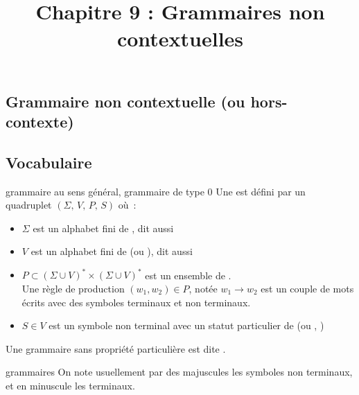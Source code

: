 

\begin{adjustwidth}{-3cm}{-3cm}

\setcounter{chapitre}{9}

\title{Chapitre 9 : Grammaires non contextuelles}
\maketitle

\section{Grammaire non contextuelle (ou hors-contexte)}

\subsection{Vocabulaire}

\begin{definition}{}{grammaire au sens général, grammaire de type 0}
    Une  est défini par un quadruplet $(\Sigma,\,V,\,P,\,S)$ où~:
    \begin{itemize}
        \item $\Sigma$ est un alphabet fini de , dit aussi 
        \item $V$ est un alphabet fini de  (ou ), dit aussi 
        \item $P \subset (\Sigma \cup V)^* \times (\Sigma \cup V)^* $ est un ensemble de .\\
        Une règle de production $(w_1,w_2) \in P$, notée $w_1 \to w_2$ est un couple de mots écrits avec des symboles terminaux et non terminaux.
        \item $S \in V$ est un symbole non terminal avec un statut particulier de  (ou , )
    \end{itemize}
    Une grammaire sans propriété particulière est dite .
\end{definition}

\begin{remarque}{}{grammaires}
    On note usuellement par des majuscules les symboles non terminaux, et en minuscule les terminaux.
\end{remarque}


\end{adjustwidth}
